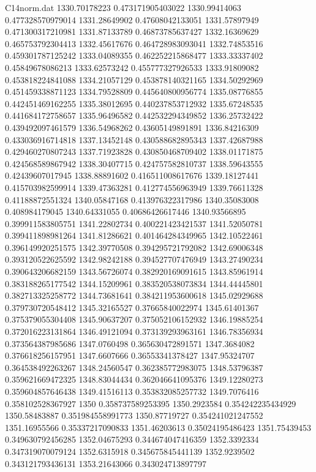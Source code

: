 \begin{filecontents}{C14norm.dat}
1330.70178223			0.473171905403022
1330.99414063			0.477328570979014
1331.28649902			0.47608042133051
1331.57897949			0.471300317210981
1331.87133789			0.46873785637427
1332.16369629			0.465753792304413
1332.45617676			0.464728983093041
1332.74853516			0.459301787125242
1333.04089355			0.462252215868477
1333.33337402			0.45849678086213
1333.62573242			0.455777327926533
1333.91809082			0.453818224841088
1334.21057129			0.453878140321165
1334.50292969			0.451459338871123
1334.79528809			0.445640800956774
1335.08776855			0.442451469162255
1335.38012695			0.440237853712932
1335.67248535			0.441684172758657
1335.96496582			0.442532294349852
1336.25732422			0.439492097461579
1336.54968262			0.43605149891891
1336.84216309			0.433036916714818
1337.13452148			0.430588682895343
1337.42687988			0.429460270807243
1337.71923828			0.430850468709402
1338.01171875			0.424568589867942
1338.30407715			0.424757582810737
1338.59643555			0.42439607017945
1338.88891602			0.416511008617676
1339.18127441			0.415703982599914
1339.47363281			0.412774556963949
1339.76611328			0.41188872551324
1340.05847168			0.413976322317986
1340.35083008			0.408984179045
1340.64331055			0.40686426617446
1340.93566895			0.399911583805751
1341.22802734			0.400221423421537
1341.52050781			0.399411898981264
1341.81286621			0.401464284349965
1342.10522461			0.396149920251575
1342.39770508			0.394295721792082
1342.69006348			0.393120522625592
1342.98242188			0.394527707476949
1343.27490234			0.390643206682159
1343.56726074			0.382920169091615
1343.85961914			0.383188265177542
1344.15209961			0.383520538073834
1344.44445801			0.382713325258772
1344.73681641			0.384211953600618
1345.02929688			0.379730720548412
1345.32165527			0.37665840022974
1345.61401367			0.375379055304408
1345.90637207			0.375052106152932
1346.19885254			0.372016223131864
1346.49121094			0.373139293963161
1346.78356934			0.373564387985686
1347.0760498			0.365630472891571
1347.3684082			0.376618256157951
1347.6607666			0.36553341378427
1347.95324707			0.364538492263267
1348.24560547			0.362385772983075
1348.53796387			0.359621669472325
1348.83044434			0.362046641095376
1349.12280273			0.359604857646438
1349.41516113			0.353832085257732
1349.7076416			0.358102528367927
1350			0.358737589253395
1350.2923584			0.354242235434929
1350.58483887			0.351984558991773
1350.87719727			0.354241021247552
1351.16955566			0.35337217090833
1351.46203613			0.35024195486423
1351.75439453			0.349630792456285
1352.04675293			0.344674047416359
1352.3392334			0.347319070079124
1352.6315918			0.345675845441139
1352.9239502			0.343121793436131
1353.21643066			0.343024713897797

\end{filecontents}
